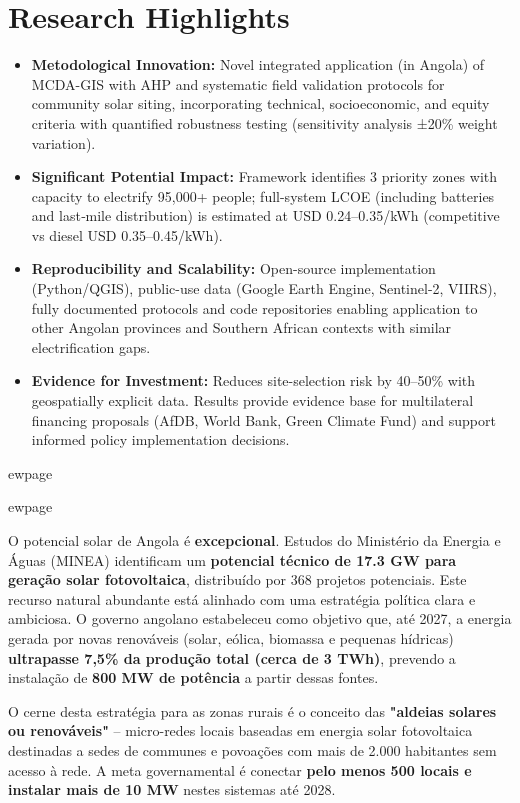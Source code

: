 \documentclass[12pt, a4paper]{article}
\begin{document}
\section*{Research Highlights}
\begin{itemize}
    \item \textbf{Metodological Innovation:} Novel integrated application (in Angola) of MCDA-GIS with AHP and systematic field validation protocols for community solar siting, incorporating technical, socioeconomic, and equity criteria with quantified robustness testing (sensitivity analysis ±20\% weight variation).
    \item \textbf{Significant Potential Impact:} Framework identifies 3 priority zones with capacity to electrify 95,000+ people; full-system LCOE (including batteries and last‑mile distribution) is estimated at USD 0.24–0.35/kWh (competitive vs diesel USD 0.35–0.45/kWh).
    \item \textbf{Reproducibility and Scalability:} Open-source implementation (Python/QGIS), public-use data (Google Earth Engine, Sentinel-2, VIIRS), fully documented protocols and code repositories enabling application to other Angolan provinces and Southern African contexts with similar electrification gaps.
    \item \textbf{Evidence for Investment:} Reduces site-selection risk by 40–50\% with geospatially explicit data. Results provide evidence base for multilateral financing proposals (AfDB, World Bank, Green Climate Fund) and support informed policy implementation decisions.
\end{itemize}


ewpage

\tableofcontents

ewpage

O potencial solar de Angola é 
\textbf{excepcional}. Estudos do Ministério da Energia e Águas (MINEA) identificam um 
\textbf{potencial técnico de 17.3 GW para geração solar fotovoltaica}, distribuído por 368 projetos potenciais. Este recurso natural abundante está alinhado com uma estratégia política clara e ambiciosa. O governo angolano estabeleceu como objetivo que, até 2027, a energia gerada por novas renováveis (solar, eólica, biomassa e pequenas hídricas) 
\textbf{ultrapasse 7,5\% da produção total (cerca de 3 TWh)}, prevendo a instalação de 
\textbf{800 MW de potência} a partir dessas fontes.

O cerne desta estratégia para as zonas rurais é o conceito das 
\textbf{"aldeias solares ou renováveis"} – micro-redes locais baseadas em energia solar fotovoltaica destinadas a sedes de communes e povoações com mais de 2.000 habitantes sem acesso à rede. A meta governamental é conectar 
\textbf{pelo menos 500 locais e instalar mais de 10 MW} nestes sistemas até 2028. 
\end{document}
